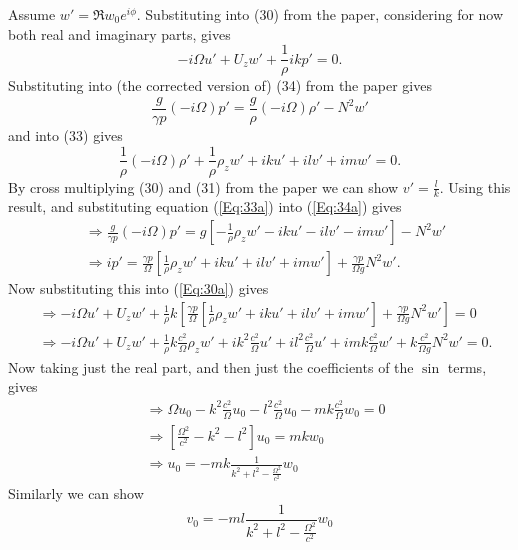 \documentclass[12pt]{article}
\begin{document}
Assume $w' = \Re{w_0 e^{i\phi}}$. Substituting into (30) from the paper, considering for now both real and imaginary parts, gives
\begin{equation}
-i\Omega u' + U_z w' +\frac{1}{\rho} i k p' = 0. \label{Eq:30a}
\end{equation}
Substituting into (the corrected version of) (34) from the paper gives
\begin{equation} \frac{g}{\gamma p} (-i\Omega) p' = \frac{g}{\rho} (-i\Omega) \rho' - N^2 w' \label{Eq:34a}
\end{equation}
and into (33) gives
\begin{equation}
\frac{1}{\rho}(-i\Omega)\rho' + \frac{1}{\rho} \rho_z w' + iku'+ilv' + im w' = 0. \label{Eq:33a}
\end{equation}
By cross multiplying (30) and (31) from the paper we can show $v' = \frac{l}{k}$. Using this result, and substituting equation (\ref{Eq:33a}) into (\ref{Eq:34a}) gives
\begin{align} 
& \Rightarrow \frac{g}{\gamma p} (-i\Omega) p' = g\left[ -\frac{1}{\rho} \rho_z w' - iku' - ilv' - im w' \right] - N^2 w' \\
&\Rightarrow ip' = \frac{\gamma p}{\Omega} \left[ \frac{1}{\rho} \rho_z w' + iku' + ilv' + im w' \right] + \frac{\gamma p}{\Omega g} N^2 w'. \label{Eq:ip'}
\end{align}
Now substituting this into (\ref{Eq:30a}) gives 
\begin{align}
& \Rightarrow -i\Omega u' + U_z w' +\frac{1}{\rho} k \left[\frac{\gamma p}{\Omega} \left[ \frac{1}{\rho} \rho_z w' + iku' + ilv' + im w' \right] + \frac{\gamma p}{\Omega g} N^2 w' \right] = 0 \\
& \Rightarrow -i\Omega u' + U_z w' +\frac{1}{\rho} k\frac{c^2}{\Omega}\rho_z w' + i k^2 \frac{c^2}{\Omega}u' + i l^2 \frac{c^2}{\Omega} u' + i m k \frac{c^2}{\Omega} w' + k \frac{c^2}{\Omega g} N^2 w' = 0. 
\end{align}
Now taking just the real part, and then just the coefficients of the $\sin$ terms, gives
\begin{align}
& \Rightarrow \Omega u_0 - k^2 \frac{c^2}{\Omega} u_0 - l^2 \frac{c^2}{\Omega} u_0 - mk\frac{c^2}{\Omega} w_0 = 0 \\ 
& \Rightarrow \left[\frac{\Omega ^2}{c^2} - k^2 - l^2 \right] u_0 = mkw_0 \\ 
& \Rightarrow u_0 = -mk \frac{1}{k^2 + l^2 - \frac{ \Omega ^2}{c^2} } w_0 
\label{Eq:u_0}
\end{align}
Similarly we can show 
\begin{equation}
v_0 = -ml \frac{1}{k^2 + l^2 - \frac{ \Omega ^2}{c^2} } w_0 
\end{equation}
\end{document}
